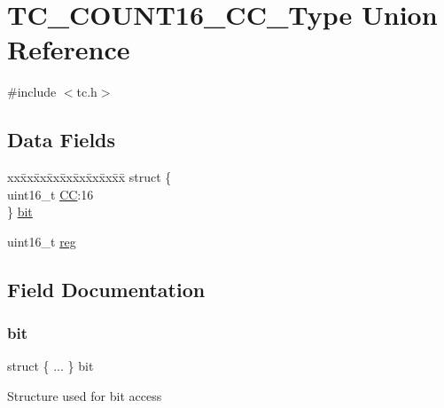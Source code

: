 \hypertarget{union_t_c___c_o_u_n_t16___c_c___type}{}\section{T\+C\+\_\+\+C\+O\+U\+N\+T16\+\_\+\+C\+C\+\_\+\+Type Union Reference}
\label{union_t_c___c_o_u_n_t16___c_c___type}


{\ttfamily \#include $<$tc.\+h$>$}

\subsection*{Data Fields}
\begin{DoxyCompactItemize}
\item 
\begin{tabbing}
xx\=xx\=xx\=xx\=xx\=xx\=xx\=xx\=xx\=\kill
struct \{\\
\>uint16\_t \mbox{\hyperlink{union_t_c___c_o_u_n_t16___c_c___type_aab3cc4f4809807eef3e8e81d8edc4633}{CC}}:16\\
\} \mbox{\hyperlink{union_t_c___c_o_u_n_t16___c_c___type_a52aaf4ec052f289e855a23b9c0e3271e}{bit}}\\

\end{tabbing}\item 
uint16\+\_\+t \mbox{\hyperlink{union_t_c___c_o_u_n_t16___c_c___type_a11760f5020019f4aa8cb02e694f7cc44}{reg}}
\end{DoxyCompactItemize}


\subsection{Field Documentation}
\mbox{\label{union_t_c___c_o_u_n_t16___c_c___type_a52aaf4ec052f289e855a23b9c0e3271e}} 
\subsubsection{\texorpdfstring{bit}{bit}}
{\footnotesize\ttfamily struct \{ ... \}   bit}

Structure used for bit access \mbox{\label{union_t_c___c_o_u_n_t16___c_c___type_aab3cc4f4809807eef3e8e81d8edc4633}} 
